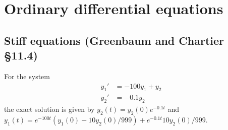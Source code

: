 \documentclass[12pt,letterpaper,noanswers]{exam}
\begin{document}
\section*{Ordinary differential equations}


\subsection*{Stiff equations (Greenbaum and Chartier \S 11.4)}




 For the system
\begin{align*}
    y_1' &=-100y_1+y_2 \\
    y_2' &= -0.1 y_2
\end{align*}
the exact solution is given by $y_2(t) = y_2(0)e^{-0.1t}$ and $y_1(t) = e^{-100t}(y_1(0) - 10y_2(0)/999)+e^{-0.1t}10y_2(0)/999$.
\end{document}
